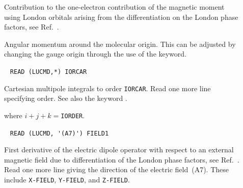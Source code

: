 \begin{description}
\item[] Contribution to the one-electron contribution of
the magnetic moment using London orbitals
 arising from the differentiation on the
London phase factors, see Ref.~\cite{thpjjcp95}.


\item[] Angular momentum around the molecular origin.
This can be adjusted by changing the gauge origin through the use of
the  keyword.


\item[]\verb| |\newline
\verb|READ (LUCMD,*) IORCAR|

Cartesian multipole integrals to order
\verb|IORCAR|. Read one more
line specifying order. See also the keyword .

where $i+j+k =$\verb|IORDER|.

\item[]\verb| |\newline
\verb|READ (LUCMD, '(A7)') FIELD1|

First derivative of the  electric dipole operator with respect to an
external magnetic field due to differentiation of the London phase
factors, see Ref.~\cite{arthkrabmjpjjcp102}. Read one more line giving
the direction of the electric field~(A7). These
include \verb|X-FIELD|, \verb|Y-FIELD|, and \verb|Z-FIELD|.


\end{description}
